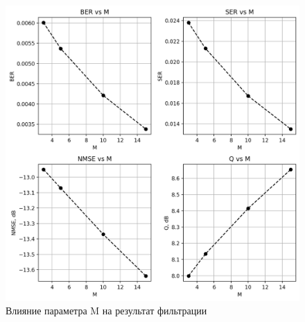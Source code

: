\documentclass[a4paper, 12pt]{extarticle}
\begin{document}
\begin{figure}[H]
    \centering
    \includegraphics[width=1\textwidth]{performance.png}
    \caption{Влияние параметра M на результат фильтрации}
    \label{fig:perf}
\end{figure}
\end{document}
